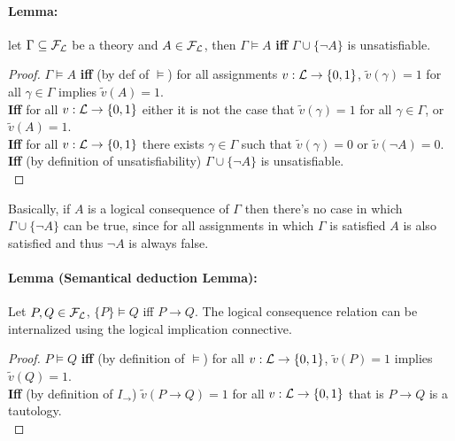 \documentclass[11pt]{article}
\begin{document}
	\paragraph{Lemma:} let $\Gamma \subseteq \mathcal{F}_\mathcal{L}$ be a theory and $A \in \mathcal{F}_\mathcal{L}$, then $\Gamma \models A$ \textbf{iff} $\Gamma \cup \{\neg A\}$ is unsatisfiable.\\
	
	\begin{proof}
		$\Gamma \models A$ \textbf{iff} (by def of $\models$) for all assignments $v: \mathcal{L} \rightarrow \{0,1\}$, $\tilde{v} (\gamma) =1$ for all $\gamma \in \Gamma$ implies $\tilde{v} (A) = 1$.\\
		
		\textbf{Iff} for all $v: \mathcal{L} \rightarrow \{0,1\}$ either it is not the case that $\tilde{v} (\gamma) = 1$ for all $\gamma \in \Gamma$, or $\tilde{v} (A) = 1$.\\
		
		\textbf{Iff} for all $v: \mathcal{L} \rightarrow \{0,1\}$ there exists $\gamma \in \Gamma$ such that $\tilde{v} (\gamma) = 0$ or $\tilde{v} (\neg A) = 0$.\\
		
		\textbf{Iff} (by definition of unsatisfiability) $\Gamma \cup \{\neg A\}$ is unsatisfiable.\\
	\end{proof}
	
	Basically, if $A$ is a logical consequence of $\Gamma$ then there's no case in which  $\Gamma \cup \{\neg A\}$ can be true, since for all assignments in which $\Gamma$ is satisfied $A$ is also satisfied and thus $\neg A$ is always false.\\
	
	\newpage
	
	\paragraph{Lemma (Semantical deduction Lemma):} Let $P,Q \in \mathcal{F}_\mathcal{L}$, $\{P\} \models Q$ iff $P \rightarrow Q$.  The logical consequence relation can be internalized using the logical implication connective.\\
	
	\begin{proof}
		$P \models Q$ \textbf{iff} (by definition of $\models$) for all $v: \mathcal{L} \rightarrow \{0,1\}$, $\tilde{v} (P) = 1$ implies $\tilde{v} (Q) = 1$.\\
		
		\textbf{Iff} (by definition of $I_\rightarrow$) $\tilde{v} (P \rightarrow Q) = 1$ for all $v: \mathcal{L} \rightarrow \{0,1\}$ that is $P \rightarrow Q$ is a tautology.\\
	\end{proof}
	
\end{document}
